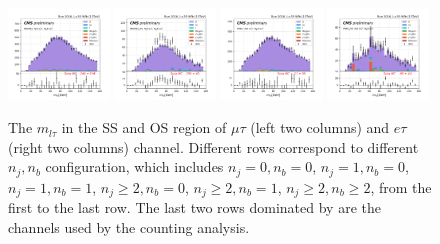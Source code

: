 \begin{figure}
    
    \includegraphics[width=0.24\textwidth]{chapters/Appendix/sectionQCD/figures/mutau_>=2_>=2_dilepton_mass.png}
    \includegraphics[width=0.24\textwidth]{chapters/Appendix/sectionQCD/figures/mutau_ss_>=2_>=2_dilepton_mass.png}
    \includegraphics[width=0.24\textwidth]{chapters/Appendix/sectionQCD/figures/etau_>=2_>=2_dilepton_mass.png}
    \includegraphics[width=0.24\textwidth]{chapters/Appendix/sectionQCD/figures/etau_ss_>=2_>=2_dilepton_mass.png}
    
    

    \caption{The $m_{l\tau}$ in the SS and OS region of $\mu\tau$ (left two columns) and $e\tau$ (right two columns) 
    channel. Different rows correspond to different $n_j,n_b$ configuration, which includes
    $n_j=0,n_b=0$, $n_j=1,n_b=0$, $n_j=1,n_b=1$, $n_j\geq 2,n_b=0$, $n_j\geq 2,n_b=1$, $n_j\geq 2,n_b\geq 2$, 
    from the first to the last row. The last two rows dominated by \ttbar are the channels used by the counting analysis.
    }
    \label{fig:appendix:qcdsf:ltau}
\end{figure}



